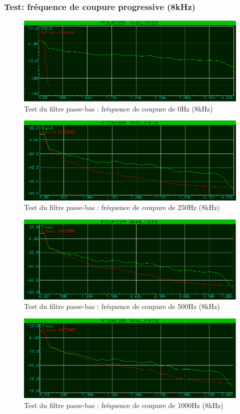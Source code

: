 \documentclass{article}
\begin{document}
    \subsubsection{Test: fréquence de coupure progressive (8kHz)}
    \begin{figure}[H]
        \centering
        \includegraphics[width=.75\textwidth]{./images/spectrum_low_pass_0_8k.png}
        \caption{Test du filtre passe-bas : fréquence de coupure de 0Hz (8kHz)}
    \end{figure}
    \begin{figure}[H]
        \centering
        \includegraphics[width=.75\textwidth]{./images/spectrum_low_pass_250_8k.png}
        \caption{Test du filtre passe-bas : fréquence de coupure de 250Hz (8kHz)}
    \end{figure}
    \begin{figure}[H]
        \centering
        \includegraphics[width=.75\textwidth]{./images/spectrum_low_pass_500_8k.png}
        \caption{Test du filtre passe-bas : fréquence de coupure de 500Hz (8kHz)}
    \end{figure}
    \begin{figure}[H]
        \centering
        \includegraphics[width=.75\textwidth]{./images/spectrum_low_pass_1000_8k.png}
        \caption{Test du filtre passe-bas : fréquence de coupure de 1000Hz (8kHz)}
    \end{figure}
\end{document}
